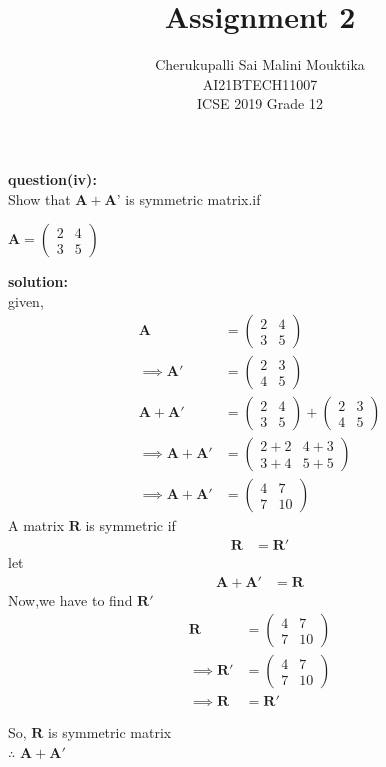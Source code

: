 \documentclass[12pt,two column]{article}
\title{Assignment 2}
\author{ Cherukupalli Sai Malini Mouktika\\\normalsize AI21BTECH11007 \\ \vspace*{10pt} \Large ICSE 2019 Grade 12}
\newcommand{\myvec}[1]{\ensuremath{\begin{pmatrix}#1\end{pmatrix}}}
\let\vec\mathbf
\begin{document}
\maketitle

\textbf{question(iv): }\\
Show that $\vec{A} + \vec{A’}$ is symmetric matrix.if

  $\vec{A} = \myvec{2 &  4 \\ 3 & 5}$

\textbf{solution: }\\
given,
\begin{align}
\vec{A} &= \myvec{2 &  4 \\ 3 & 5}\\
\implies
\vec{A'} &=\myvec{2 &  3 \\ 4 & 5}\\
\vec{A}+\vec{A'} &= \myvec{2 &  4 \\ 3 & 5}+\myvec{2 &  3 \\ 4 & 5}\\
\implies
\vec{A}+\vec{A'} &= \myvec{2+2 &  4+3 \\ 3+4 & 5+5}\\
\implies
\vec{A}+\vec{A'} &= \myvec{4 &  7 \\ 7 & 10}
\end{align}
A matrix  $\vec{R}$ is symmetric if 
\begin{align}
\vec{R} &=\vec{R'}
\end{align}
let
\begin{align}
 \vec{A}+\vec{A'} &= \vec{R}   
\end{align}
Now,we have to find $\vec{R'}$
\begin{align}
\vec{R} &= \myvec{4 &  7 \\ 7 & 10}\\
\implies
\vec{R'}  &= \myvec{4 &  7 \\ 7 & 10}\\
\implies
\vec{R} &= \vec{R'}
\end{align}

So, $\vec{R}$ is symmetric matrix\\
$\therefore$ $\vec{A}+\vec{A'}$ 
\end{document}
